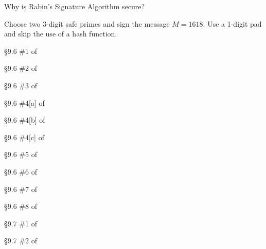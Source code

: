 \begin{problem}[10 points]
	Why is Rabin's Signature Algorithm secure?
\end{problem}

\begin{problem}[10 points]
	Choose two 3-digit safe primes and sign the message $M=1618$. Use a 1-digit pad and skip the use of a hash function.
\end{problem}

\begin{problem}[15 points]
	\S 9.6 \#1 of \cite {tw}
\end{problem}

\begin{problem}[15 points]
	\S 9.6 \#2 of \cite {tw}
\end{problem}

\begin{problem}[10 points]
	\S 9.6 \#3 of \cite {tw}
\end{problem}

\begin{problem}[10 points]
	\S 9.6 \#4[a] of \cite {tw}
\end{problem}

\begin{problem}[10 points]
	\S 9.6 \#4[b] of \cite {tw}
\end{problem}

\begin{problem}[10 points]
	\S 9.6 \#4[c] of \cite {tw}
\end{problem}

\begin{problem}[15 points]
	\S 9.6 \#5 of \cite {tw}
\end{problem}

\begin{problem}[10 points]
	\S 9.6 \#6 of \cite {tw}
\end{problem}

\begin{problem}[10 points]
	\S 9.6 \#7 of \cite {tw}
\end{problem}

\begin{problem}[15 points]
	\S 9.6 \#8 of \cite {tw}
\end{problem}

\begin{problem}[10 points]
	\S 9.7 \#1 of \cite {tw}
\end{problem}

\begin{problem}[10 points]
	\S 9.7 \#2 of \cite {tw}
\end{problem}

